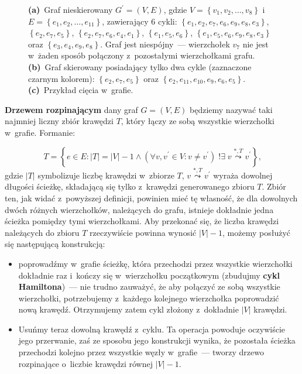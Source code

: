 \begin{figure}[!htbp]
\begin{subfigure}[b]{0.32\textwidth}
		\caption{}
		\label{fig:defExample:c}
	\end{subfigure}
	\hfill\null
	\caption{
		\textbf{(a)}~Graf nieskierowany $G^{\prime} = \left( V, E \right)$, gdzie $V = \left\{ v_{1}, v_{2}, \dots, v_{8} \right\}$ i~$E = \left\{ e_{1}, e_{2}, \dots, e_{11} \right\}$, zawierający $6$ cykli: $\left\{ e_{1}, e_{2}, e_{7}, e_{6}, e_{9}, e_{8}, e_{3} \right\}$, $\left\{ e_{2}, e_{7}, e_{5} \right\}$, $\left\{ e_{2}, e_{7}, e_{6}, e_{4}, e_{1} \right\}$, $\left\{ e_{1}, e_{5}, e_{6} \right\}$, $\left\{ e_{1}, e_{5}, e_{6}, e_{9}, e_{8}, e_{3} \right\}$ oraz $\left\{ e_{3}, e_{4}, e_{9}, e_{8} \right\}$.
		Graf jest niespójny~--- wierzchołek $v_{7}$ nie jest w~żaden sposób połączony z~pozostałymi wierzchołkami grafu.
		\textbf{(b)}~Graf skierowany posiadający tylko dwa cykle (zaznaczone czarnym kolorem): $\left\{ e_{2}, e_{7}, e_{5} \right\}$ oraz $\left\{ e_{2}, e_{11}, e_{10}, e_{9}, e_{6}, e_{5} \right\}$.
		\textbf{(c)}~Przykład cięcia w~grafie.
	}
	\label{fig:defExample}
\end{figure}

\textbf{Drzewem rozpinającym} dany graf $G = \left( V, E \right)$ będziemy nazywać taki najmniej liczny zbiór krawędzi $T$, który łączy ze sobą wszystkie wierzchołki w~grafie.
Formanie:

\begin{equation}
	T = \left\{ e \in E : \left| T \right| = \left| V \right| - 1 \wedge \left( \forall v, v^{\prime} \in V : v \neq v^{\prime} \right) \; !\exists \; v \overset{\ast, T}{\leadsto} v^{\prime} \right\}\text{,}
\end{equation}
gdzie $\left| T \right|$ symbolizuje liczbę krawędzi w~zbiorze $T$, $v \overset{\ast, T}{\leadsto} v^{\prime}$ wyraża dowolnej długości ścieżkę, składającą się tylko z~krawędzi generowanego zbioru $T$.
Zbiór ten, jak widać z~powyższej definicji, powinien mieć tę własność, że dla dowolnych dwóch różnych wierzchołków, należących do grafu, istnieje dokładnie jedna ścieżka pomiędzy tymi wierzchołkami.
Aby przekonać się, że liczba krawędzi należących do zbioru $T$ rzeczywiście powinna wynosić $\left| V \right| - 1$, możemy posłużyć się następującą konstrukcją:

\begin{itemize}
	\item poprowadźmy w~grafie ścieżkę, która przechodzi przez wszystkie wierzchołki dokładnie raz i~kończy się w~wierzchołku początkowym (zbudujmy \textbf{cykl Hamiltona})~--- nie trudno zauważyć, że aby połączyć ze sobą wszystkie wierzchołki, potrzebujemy z~każdego kolejnego wierzchołka poprowadzić nową krawędź.
	Otrzymujemy zatem cykl złożony z~dokładnie $\left| V \right|$ krawędzi.
	\item Usuńmy teraz dowolną krawędź z~cyklu.
	Ta operacja powoduje oczywiście jego przerwanie, zaś ze sposobu jego konstrukcji wynika, że pozostała ścieżka przechodzi kolejno przez wszystkie węzły w~grafie~--- tworzy drzewo rozpinające o~liczbie krawędzi równej $\left| V \right| - 1$.
\end{itemize}




